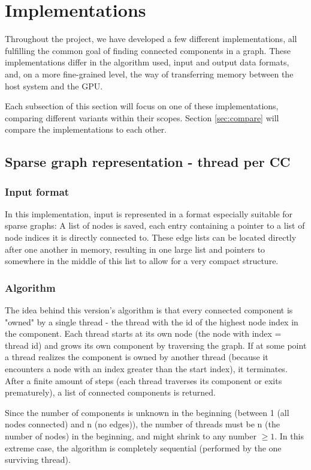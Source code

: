 \documentclass[letta4 paper]{article}
\numberwithin{equation}{section}
\newcommand{\0}{\mathbf{0}}
\begin{document}
\newpage

\section{Implementations}
Throughout the project, we have developed a few different implementations, all
fulfilling the common goal of finding connected components in a graph. These
implementations differ in the algorithm used, input and output data formats,
and, on a more fine-grained level, the way of transferring memory between the
host system and the GPU.

Each subsection of this section will focus on one
of these implementations, comparing different variants within their
scopes. Section \ref{sec:compare} will compare the implementations to each
other.

\subsection{Sparse graph representation - thread per CC}
\subsubsection{Input format}
In this implementation, input is represented in a format especially suitable
for sparse graphs: A list of nodes is saved, each entry containing a pointer
to a list of node indices it is directly connected to. These edge lists can be
located directly after one another in memory, resulting in one large list and
pointers to somewhere in the middle of this list to allow for a very compact
structure.

\subsubsection{Algorithm}
The idea behind this version's algorithm is that every connected component is
"owned" by a single thread - the thread with the id of the highest node index
in the component. Each thread starts at its own node (the node with index =
thread id) and grows its own component by traversing the graph. If at some
point a thread realizes the component is owned by another thread (because it
encounters a node with an index greater than the start index), it
terminates. After a finite amount of steps (each thread traverses its
component or exits prematurely), a list of connected components is
returned.

Since the number of components is unknown in the beginning
(between 1 (all nodes connected) and n (no edges)), the number of threads must
be n (the number of nodes) in the beginning, and might shrink to any number
$\ge 1$. In this extreme case, the algorithm is completely sequential
(performed by the one surviving thread).
\end{document}
